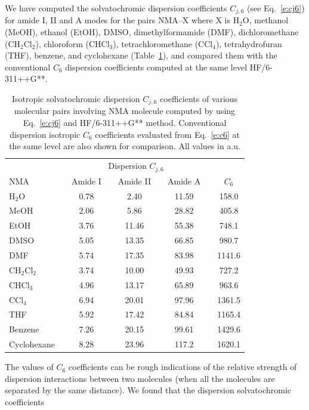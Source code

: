\documentclass[b5paper,oneside,fleqn,11pt]{book}
\begin{document}
\begin{refsection}
We have computed the solvatochromic dispersion coefficients
$C_{j,6}$ (see Eq.~\eqref{e:cj6}) for amide I, II and A modes for the pairs NMA--X
where X is H$_2$O, methanol (MeOH), ethanol (EtOH), DMSO,
dimethylformamide (DMF), dichloromethane (CH$_2$Cl$_2$), chloroform
(CHCl$_3$), tetrachloromethane (CCl$_4$), tetrahydrofuran
(THF), benzene, and cyclohexane (Table~\ref{t:cj6}),
and compared them with the conventional $C_6$ dispersion coefficients
computed at the same level HF/6-311++G**. 
%
\begin{table}[t!]
\caption{
Isotropic solvatochromic dispersion $C_{j,6}$ coefficients of various
molecular pairs involving NMA molecule computed
by using Eq.~\eqref{e:cj6} and HF/6-311++G** method. Conventional dispersion
isotropic $C_6$ coefficients evaluated from Eq.~\eqref{e:c6} at the same level are also
shown for comparison. All values in a.u.
\label{t:cj6}}
\begin{tabular*}{1.0\textwidth}{@{\extracolsep{\fill} } l cccccccc }
\hline\hline
 && \multicolumn{5}{c}{Dispersion $C_{j,6}$} && \\
\cline{3-7}
NMA && Amide I && Amide II && Amide A && $C_6$ \\
\hline
H$_2$O       && 0.78 && 2.40  && 11.59 && 158.0 \\
MeOH         && 2.06 && 5.86  && 28.82 && 405.8 \\
EtOH         && 3.76 && 11.46 && 55.38 && 748.1 \\
DMSO         && 5.05 && 13.35 && 66.85 && 980.7 \\
DMF          && 5.74 && 17.35 && 83.98 && 1141.6 \\
CH$_2$Cl$_2$ && 3.74 && 10.00 && 49.93 && 727.2 \\
CHCl$_3$     && 4.96 && 13.17 && 65.89 && 963.6 \\
CCl$_4$      && 6.94 && 20.01 && 97.96 && 1361.5 \\
THF          && 5.92 && 17.42 && 84.84 && 1165.4 \\
Benzene      && 7.26 && 20.15 && 99.61 && 1429.6 \\
Cyclohexane  && 8.28 && 23.96 && 117.2 && 1620.1 \\
\hline\hline
\end{tabular*}
\end{table}
%
The values of $C_6$ coefficients
can
be rough indications of the relative strength of dispersion interactions
between two molecules (when all the molecules are separated by the same
distance). We found that the dispersion solvatochromic coefficients

\end{refsection}
\end{document}
